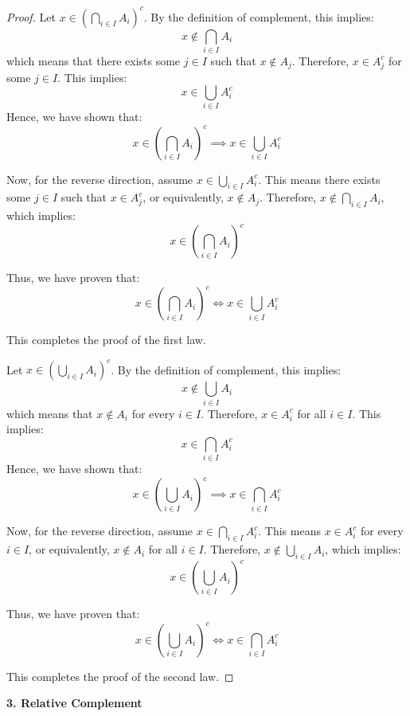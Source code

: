 \begin{proof}
    
    Let \( x \in \left( \bigcap_{i \in I} A_i \right)^c \). By the definition of complement, this implies:
    \[
    x \notin \bigcap_{i \in I} A_i
    \]
    which means that there exists some \( j \in I \) such that \( x \notin A_j \). Therefore, \( x \in A_j^c \) for some \( j \in I \). This implies:
    \[
    x \in \bigcup_{i \in I} A_i^c
    \]
    Hence, we have shown that:
    \[
    x \in \left( \bigcap_{i \in I} A_i \right)^c \implies x \in \bigcup_{i \in I} A_i^c
    \]
    
    Now, for the reverse direction, assume \( x \in \bigcup_{i \in I} A_i^c \). This means there exists some \( j \in I \) such that \( x \in A_j^c \), or equivalently, \( x \notin A_j \). Therefore, \( x \notin \bigcap_{i \in I} A_i \), which implies:
    \[
    x \in \left( \bigcap_{i \in I} A_i \right)^c
    \]
    
    Thus, we have proven that:
    \[
    x \in \left( \bigcap_{i \in I} A_i \right)^c \iff x \in \bigcup_{i \in I} A_i^c
    \]

    This completes the proof of the first law.

    \vspace{10pt}
    
    Let \( x \in \left( \bigcup_{i \in I} A_i \right)^c \). By the definition of complement, this implies:
    \[
    x \notin \bigcup_{i \in I} A_i
    \]
    which means that \( x \notin A_i \) for every \( i \in I \). Therefore, \( x \in A_i^c \) for all \( i \in I \). This implies:
    \[
    x \in \bigcap_{i \in I} A_i^c
    \]
    Hence, we have shown that:
    \[
    x \in \left( \bigcup_{i \in I} A_i \right)^c \implies x \in \bigcap_{i \in I} A_i^c
    \]
    
    Now, for the reverse direction, assume \( x \in \bigcap_{i \in I} A_i^c \). This means \( x \in A_i^c \) for every \( i \in I \), or equivalently, \( x \notin A_i \) for all \( i \in I \). Therefore, \( x \notin \bigcup_{i \in I} A_i \), which implies:
    \[
    x \in \left( \bigcup_{i \in I} A_i \right)^c
    \]
    
    Thus, we have proven that:
    \[
    x \in \left( \bigcup_{i \in I} A_i \right)^c \iff x \in \bigcap_{i \in I} A_i^c
    \]

    This completes the proof of the second law.
\end{proof}

\textbf{3. Relative Complement}

